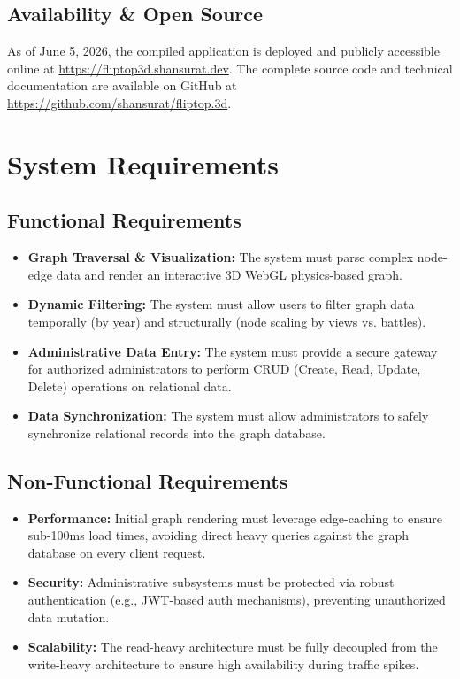 \documentclass[12pt,a4paper]{article}
\begin{document}
\subsection{Availability \& Open Source}
As of June 5, 2026, the compiled application is deployed and publicly accessible online at \url{https://fliptop3d.shansurat.dev}. 
The complete source code and technical documentation are available on GitHub at \url{https://github.com/shansurat/fliptop.3d}.
\section{System Requirements}

\subsection{Functional Requirements}
\begin{itemize}
    \item \textbf{Graph Traversal \& Visualization:} The system must parse complex node-edge data and render an interactive 3D WebGL physics-based graph.
    \item \textbf{Dynamic Filtering:} The system must allow users to filter graph data temporally (by year) and structurally (node scaling by views vs. battles).
    \item \textbf{Administrative Data Entry:} The system must provide a secure gateway for authorized administrators to perform CRUD (Create, Read, Update, Delete) operations on relational data.
    \item \textbf{Data Synchronization:} The system must allow administrators to safely synchronize relational records into the graph database.
\end{itemize}

\subsection{Non-Functional Requirements}
\begin{itemize}
    \item \textbf{Performance:} Initial graph rendering must leverage edge-caching to ensure sub-100ms load times, avoiding direct heavy queries against the graph database on every client request.
    \item \textbf{Security:} Administrative subsystems must be protected via robust authentication (e.g., JWT-based auth mechanisms), preventing unauthorized data mutation.
    \item \textbf{Scalability:} The read-heavy architecture must be fully decoupled from the write-heavy architecture to ensure high availability during traffic spikes.
\end{itemize}
\end{document}

